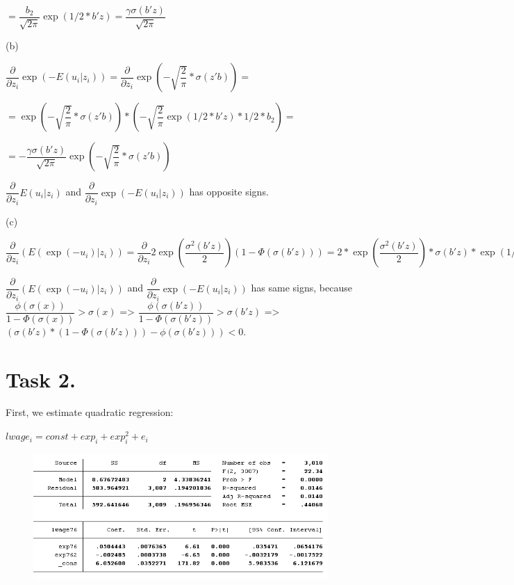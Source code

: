 \documentclass[12pt,a4paper, oneside]{extreport}
\begin{document}
$= \dfrac{b_2}{\sqrt{2\pi}} \exp(1/2 * b'z)  =  \dfrac{\gamma \sigma(b'z)}{\sqrt{2\pi}} $

(b)

$\dfrac{\partial}{\partial z_i }\exp(- E(u_i|z_i) )  =   \dfrac{\partial}{\partial z_i } \exp(- \sqrt{\dfrac{2}{\pi}} * \sigma(z'b)  ) = $

$=  \exp(- \sqrt{\dfrac{2}{\pi}} * \sigma(z'b)  ) * (- \sqrt{\dfrac{2}{\pi}} \exp(1/2 * b'z) * 1/2 * b_2  )  = $


$ =  -  \dfrac{\gamma \sigma(b'z)}{\sqrt{2\pi}} \exp(- \sqrt{\dfrac{2}{\pi}} * \sigma(z'b)  )
$

$\dfrac{\partial}{\partial z_i } E(u_i|z_i)$ and $\dfrac{\partial}{\partial z_i }\exp(- E(u_i|z_i) ) $ has opposite signs.

(c)

$\dfrac{\partial}{\partial z_i }( E(\exp (-u_i) |z_i) )  =  \dfrac{\partial}{\partial z_i } 2 \exp(\dfrac{\sigma^2(b'z)}{2}) (1-\Phi (\sigma(b'z))    )  =  2 * \exp(\dfrac{\sigma^2(b'z)}{2}) * \sigma(b'z) * \exp(1/2 * b'z) * 1/2 * b_2  *  (1-\Phi (\sigma(b'z))    )   + 2 * \exp(\dfrac{\sigma^2(b'z)}{2}) * (-\phi(\sigma(b'z)) * \exp(1/2 * b'z) * 1/2 * b_2)  =   \gamma \sigma(b'z) \exp(\dfrac{\sigma^2(b'z)}{2}) ( \sigma(b'z) *  (1-\Phi (\sigma(b'z))    )   -\phi(\sigma(b'z))   ) $

$\dfrac{\partial}{\partial z_i }( E(\exp (-u_i) |z_i) ) $ and $\dfrac{\partial}{\partial z_i }\exp(- E(u_i|z_i) ) $ has same signs,  \newline because 
$\dfrac{\phi(\sigma(x))}{1-\Phi (\sigma(x))} > \sigma(x)$ =>
$\dfrac{\phi(\sigma(b'z))}{1-\Phi (\sigma(b'z))} > \sigma(b'z)$ =>  \newline 
$( \sigma(b'z) *  (1-\Phi (\sigma(b'z))    )   -\phi(\sigma(b'z))   ) <0$.



\section*{Task 2.}

First, we estimate quadratic regression: 

$lwage_i = const + exp_i + exp_i^2 + e_i$

\begin{figure}[H]
	\centering
	\includegraphics[width=0.7\linewidth]{screenshot002}
	\label{fig:screenshot001}
\end{figure}
\end{document}
